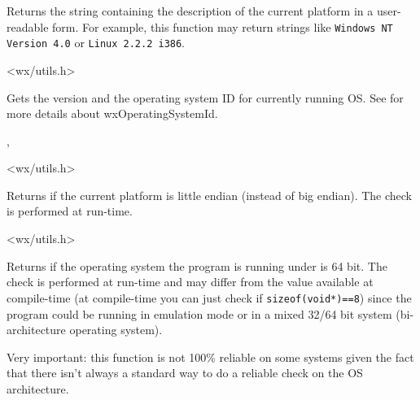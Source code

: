 
Returns the string containing the description of the current platform in a
user-readable form. For example, this function may return strings like
{\tt Windows NT Version 4.0} or {\tt Linux 2.2.2 i386}.




<wx/utils.h>


\label{wxgetosversion}


Gets the version and the operating system ID for currently running OS.
See  for more details about wxOperatingSystemId.


,


<wx/utils.h>


\label{wxisplatformlittleendian}


Returns \true if the current platform is little endian (instead of big endian).
The check is performed at run-time.




<wx/utils.h>


\label{wxisplatform64bit}


Returns \true if the operating system the program is running under is 64 bit.
The check is performed at run-time and may differ from the value available at
compile-time (at compile-time you can just check if {\tt sizeof(void*)==8})
since the program could be running in emulation mode or in a mixed 32/64 bit system
(bi-architecture operating system).

Very important: this function is not 100\% reliable on some systems given the fact
that there isn't always a standard way to do a reliable check on the OS architecture.

